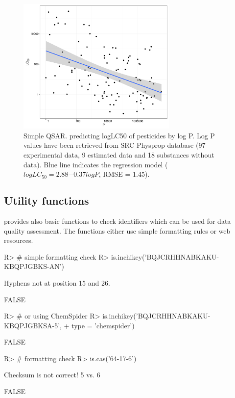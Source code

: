 \documentclass[article, shortnames]{jss}\usepackage[]{graphicx}\usepackage[]{color}
\begin{document}
\begin{figure}[ht]
\begin{CodeChunk}


{\centering \includegraphics[width=0.7\textwidth]{plot_qsar-1} 

}

\end{CodeChunk}
\caption{Simple QSAR. predicting logLC50 of pesticides by log P. 
Log P values have been retrieved from SRC Physprop database (97 experimental data, 9 estimated data and 18 substances without data). 
Blue line indicates the regression model ($log LC_{50} = 2.88\ensuremath{-0.37} logP$, RMSE = 1.45).}
\label{fig:fig3}
\end{figure}


\subsection[Utility functions]{Utility functions}
 provides also basic functions to check identifiers which can be used for data quality assessment.
The functions either use simple formatting rules or web resources.

\begin{CodeChunk}
\begin{CodeInput}
R> # simple formatting check
R> is.inchikey('BQJCRHHNABKAKU-KBQPJGBKS-AN')
\end{CodeInput}
\begin{CodeOutput}
Hyphens not at position 15 and 26.
\end{CodeOutput}
\begin{CodeOutput}
[1] FALSE
\end{CodeOutput}
\begin{CodeInput}
R> # or using ChemSpider
R> is.inchikey('BQJCRHHNABKAKU-KBQPJGBKSA-5', 
+        type = 'chemspider')
\end{CodeInput}
\begin{CodeOutput}
[1] FALSE
\end{CodeOutput}
\begin{CodeInput}
R> # formatting check
R> is.cas('64-17-6')
\end{CodeInput}
\begin{CodeOutput}
Checksum is not correct! 5 vs. 6
\end{CodeOutput}
\begin{CodeOutput}
[1] FALSE
\end{CodeOutput}
\end{CodeChunk}
\end{document}
